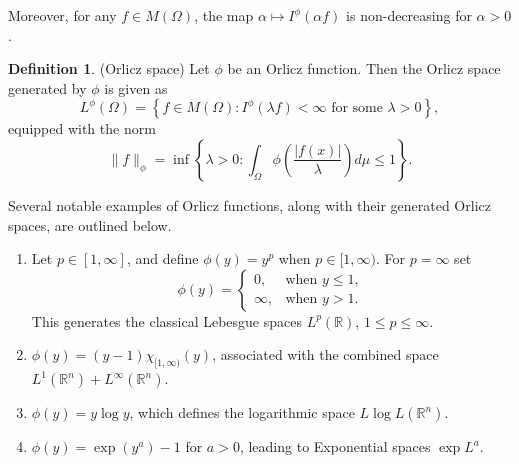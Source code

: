 \documentclass[11pt, a4paper]{article}
\theoremstyle{definition}
\newtheorem{defin}[thm]{Definition}
\numberwithin{equation}{section}
\def\CC{\mathbb C}
\def\RR{\mathbb R}
\begin{document}
Moreover, for any $f \in  M(\Omega)$, the map $\alpha\mapsto I^{\phi}(\alpha f)$ is non-decreasing for $\alpha >0$.
\begin{defin} (Orlicz space)
    Let $\phi$ be an Orlicz function. Then the Orlicz space generated by $\phi$ is given as $$L^{\phi}(\Omega)= \left\lbrace  f \in M(\Omega) : I^{\phi}(\lambda f) < \infty \hspace{4pt} \text{for some } \lambda >0 \right\rbrace, $$ equipped with the norm $$\|f\|_{\phi}= \inf \left\lbrace \lambda >0 : \int_{\Omega} \phi\left(\frac{{|f(x)|}}{\lambda}\right)d\mu \leq 1 \right\rbrace.$$
\end{defin}
Several notable examples of Orlicz functions, along with their generated Orlicz spaces, are outlined below.
\begin{enumerate} [label=(\roman*), left=0pt]
    \item Let \( p \in [1, \infty] \), and define $\phi(y)=y^p$ when $p \in [1, \infty).$ 
    For $p=\infty$ set \[\phi(y) = 
    \begin{cases}
        0, & \text{when }  y \leq 1, \\
        \infty, & \text{when } y > 1.
    \end{cases}\]
    This generates the classical Lebesgue spaces $L^p(\RR)$, $1\leq p \leq \infty.$
    
    \item $\phi(y)=(y-1)\chi_{[1,\infty)}(y)$, associated with the combined space $L^1(\RR^n)+L^{\infty}(\RR^n)$.
	
    \item $\phi(y)=y\log y$, which defines the logarithmic space $L\log L(\RR^n)$.
	
    \item $\phi(y)=\exp(y^a)-1$ for $a>0$, leading to Exponential spaces $\exp L^a$.
\end{enumerate}
	
\end{document}
